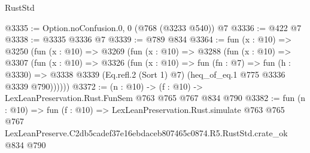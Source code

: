 \begin{lexlean}{RustStd}
\begin{coremodule}
@3335 := Option.noConfusion.{0, 0} (@768 (@3233 @540)) @7
@3336 := @422 @7
@3338 := @3335 @3336 @7
@3339 := @789 @834
@3364 := fun (x : @10) =>
  @3250
    (fun (x : @10) =>
    @3269
      (fun (x : @10) =>
      @3288
        (fun (x : @10) =>
        @3307
          (fun (x : @10) =>
          @3326
            (fun (x : @10) =>
            fun (fn : @7) =>
            fun (h : @3330) =>
            @3338 @3339 (Eq.refl.{2} (Sort 1) @7) (heq_of_eq.{1} @775 @3336 @3339 @790))))))
@3372 := (n : @10) -> (f : @10) -> LexLeanPreservation.Rust.FunSem @763 @765 @767 @834 @790
@3382 := fun (n : @10) =>
  fun (f : @10) =>
  LexLeanPreservation.Rust.simulate
    @763
    @765
    @767
    LexLeanPreserve.C2db5cadef37e16ebdaceb807465c0874.R5.RustStd.crate_ok
    @834
    @790
\end{coremodule}
\end{lexlean}
